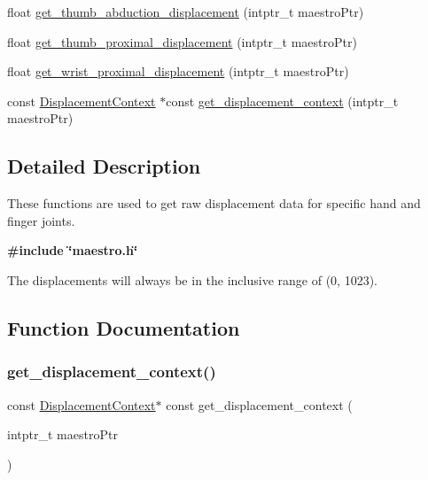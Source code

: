 \begin{DoxyCompactItemize}
\item 
float \hyperlink{group__displacement_access_gaed15e3a23d0b98f46f78d7dadca62668}{get\+\_\+thumb\+\_\+abduction\+\_\+displacement} (intptr\+\_\+t maestro\+Ptr)
\item 
float \hyperlink{group__displacement_access_ga86d0adfde28a3008a21fb4620e4b93df}{get\+\_\+thumb\+\_\+proximal\+\_\+displacement} (intptr\+\_\+t maestro\+Ptr)
\item 
float \hyperlink{group__displacement_access_gab799e09f1b944ca87b1567a9a9ae2ee4}{get\+\_\+wrist\+\_\+proximal\+\_\+displacement} (intptr\+\_\+t maestro\+Ptr)
\item 
const \hyperlink{struct_displacement_context}{Displacement\+Context} $\ast$const \hyperlink{group__displacement_access_ga26563f1c104bd9a0d80ab8c0afd1e8bd}{get\+\_\+displacement\+\_\+context} (intptr\+\_\+t maestro\+Ptr)
\end{DoxyCompactItemize}


\subsection{Detailed Description}
These functions are used to get raw displacement data for specific hand and finger joints. 

{\bfseries {\ttfamily \#include \char`\"{}maestro.\+h\char`\"{}}}

The displacements will always be in the inclusive range of (0, 1023). 

\subsection{Function Documentation}
\mbox{\label{group__displacement_access_ga26563f1c104bd9a0d80ab8c0afd1e8bd}} 
\subsubsection{\texorpdfstring{get\+\_\+displacement\+\_\+context()}{get\_displacement\_context()}}
{\footnotesize\ttfamily const \hyperlink{struct_displacement_context}{Displacement\+Context}$\ast$ const get\+\_\+displacement\+\_\+context (\begin{DoxyParamCaption}\item[{intptr\+\_\+t}]{maestro\+Ptr }\end{DoxyParamCaption})}


